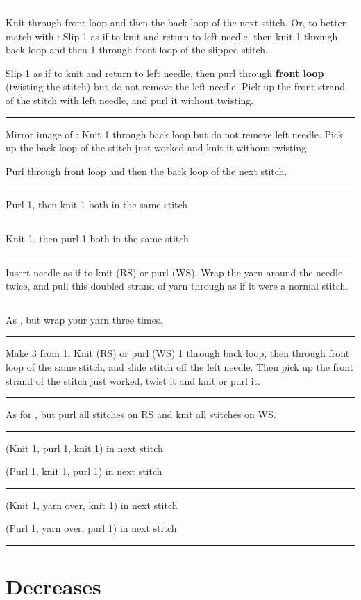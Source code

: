 \documentclass{article}
\newif \ifdesigner
\newlength{\symbolcolwidth}
\newlength{\singlecolwidth}
\newlength{\doublecolwidth}
\newcommand\keyrow[3]{\par\allowbreak\hrule\par\nopagebreak\noindent
	\vrule\hfill 
	\begin{minipage}{\symbolcolwidth}\centering#1\end{minipage}%
	\hfill\vrule\hfill
	\begin{minipage}{\singlecolwidth}
		\raisebox{1pt}{\strut}#2\raisebox{-1pt}{\strut}\end{minipage}%
	\hfill\vrule\hfill
	\begin{minipage}{\singlecolwidth}
		\raisebox{1pt}{\strut}#3\raisebox{-1pt}{\strut}\end{minipage}%
	\hfill\vrule
	\par\nointerlineskip}
\newcommand\dblkeyrow[2]{\par\allowbreak\hrule\par\nopagebreak\noindent
	\vrule\hfill
	\begin{minipage}{\symbolcolwidth}\centering#1\end{minipage}%
	\hfill\vrule\hfill
	\begin{minipage}{\doublecolwidth}
		\raisebox{1pt}{\strut}#2\raisebox{-1pt}{\strut}\end{minipage}%
	\hfill\vrule
	\par\nointerlineskip}
\begin{document}
\begin{fullpages}
\keyrow{}{Knit through front loop and then the back loop of the next stitch. Or, to better match with \textknit{u}: Slip 1 as if to knit and return to left needle, then knit 1 through back loop and then 1 through front loop of the slipped stitch.}{Slip 1 as if to knit and return to left needle, then purl through \textbf{front loop} (twisting the stitch) but do not remove the left needle. Pick up the front strand of the stitch with left needle, and purl it without twisting.}
\keyrow{}{Mirror image of : Knit 1 through back loop but do not remove left needle. Pick up the back loop of the stitch just worked and knit it without twisting.}{Purl through front loop and then the back loop of the next stitch.}
\dblkeyrow{}{Purl 1, then knit 1 both in the same stitch}
\dblkeyrow{}{Knit 1, then purl 1 both in the same stitch}
\dblkeyrow{}{Insert needle as if to knit (RS) or purl (WS). Wrap the yarn around the needle twice, and pull this doubled strand of yarn through as if it were a normal stitch.}
\dblkeyrow{}{As , but wrap your yarn three times.}
\dblkeyrow{}{Make 3 from 1: Knit (RS) or purl (WS) 1 through back loop, then through front loop of the same stitch, and slide stitch off the left needle. Then pick up the front strand of the stitch just worked, twist it and knit or purl it.}
\dblkeyrow{}{As for , but purl all stitches on RS and knit all stitches on WS.}
\keyrow{}{(Knit 1, purl 1, knit 1) in next stitch}{(Purl 1, knit 1, purl 1) in next stitch}
\keyrow{}{(Knit 1, yarn over, knit 1) in next stitch}{(Purl 1, yarn over, purl 1) in next stitch}
\hrule

\clearpage

\section{Decreases}

\ifdesigner
Purl decreases produce strong diagonal lines on the wrong side. You
may wish to use \textknit{;} for p2tog and \textknit{:} for SSP tbl if
you wish to clearly indicate which way these diagonal lines slant.

You may also think that \textknit{4} and \textknit{5} look better in your pattern than \textknit{<} and \textknit{>}; their definitions may be interchanged.

\nopagebreak

\medskip
\fi


\end{fullpages}
\end{document}
